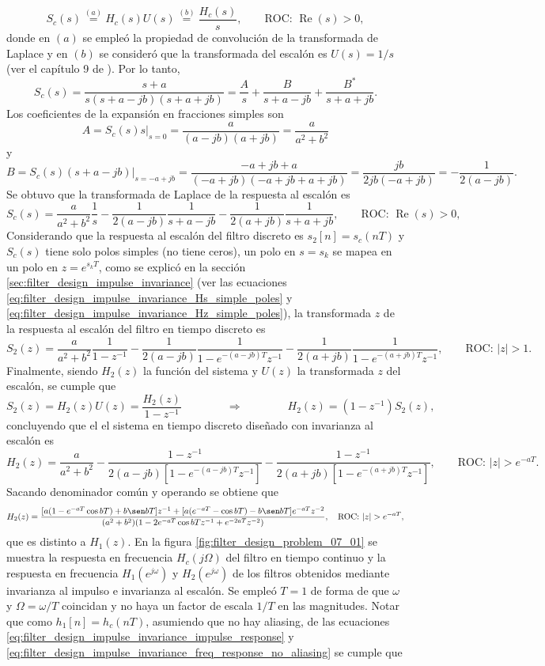 \documentclass[a4paper]{report}
\renewcommand{\Re}{\operatorname{Re}}
\begin{document}
\[
 S_c(s)\overset{(a)}{=}H_c(s)U(s)\overset{(b)}{=}\frac{H_c(s)}{s},
 \qquad\textrm{ROC: }\Re(s)>0,
\]
donde en \((a)\) se empleó la propiedad de convolución de la transformada de Laplace y en \((b)\) se consideró que la transformada del escalón es  \(U(s)=1/s\) (ver el capítulo 9 de \cite{oppenheim1997signals}). Por lo tanto,
\[
 S_c(s)=\frac{s+a}{s(s+a-jb)(s+a+jb)}
  =\frac{A}{s}+\frac{B}{s+a-jb}+\frac{B^*}{s+a+jb}.
\]
Los coeficientes de la expansión en fracciones simples son
\[
 A=S_c(s)s\Big|_{s=0}=\frac{a}{(a-jb)(a+jb)}=\frac{a}{a^2+b^2}
\]
y
\[
 B=S_c(s)(s+a-jb)\Big|_{s=-a+jb}=\frac{-a+jb+a}{(-a+jb)(-a+jb+a+jb)}=\frac{jb}{2jb(-a+jb)}=-\frac{1}{2(a-jb)}.
\]
Se obtuvo que la transformada de Laplace de la respuesta al escalón es  
\[
 S_c(s)=\frac{a}{a^2+b^2}\frac{1}{s}-\frac{1}{2(a-jb)}\frac{1}{s+a-jb}-\frac{1}{2(a+jb)}\frac{1}{s+a+jb},
 \qquad\textrm{ROC: }\Re(s)>0,
\]
Considerando que la respuesta al escalón del filtro discreto es \(s_2[n]=s_c(nT)\) y \(S_c(s)\) tiene solo polos simples (no tiene ceros), un polo en \(s=s_k\) se mapea en un polo en \(z=e^{s_kT}\), como se explicó en la sección \ref{sec:filter_design_impulse_invariance} (ver las ecuaciones \ref{eq:filter_design_impulse_invariance_Hs_simple_poles} y \ref{eq:filter_design_impulse_invariance_Hz_simple_poles}), la transformada \(z\) de la respuesta al escalón del filtro en tiempo discreto es
\[
 S_2(z)=\frac{a}{a^2+b^2}\frac{1}{1-z^{-1}}-\frac{1}{2(a-jb)}\frac{1}{1-e^{-(a-jb)T}z^{-1}}-\frac{1}{2(a+jb)}\frac{1}{1-e^{-(a+jb)T}z^{-1}},
 \qquad\textrm{ROC: }|z|>1.
\]
Finalmente, siendo \(H_2(z)\) la función del sistema y \(U(z)\) la transformada \(z\) del escalón, se cumple que 
\[
 S_2(z)=H_2(z)U(z)=\frac{H_2(z)}{1-z^{-1}}
 \qquad\qquad\Rightarrow\qquad\qquad
 H_2(z)=(1-z^{-1})S_2(z),
\]
concluyendo que el el sistema en tiempo discreto diseñado con invarianza al escalón es
\[
 H_2(z)=\frac{a}{a^2+b^2}-\frac{1-z^{-1}}{2(a-jb)[1-e^{-(a-jb)T}z^{-1}]}-\frac{1-z^{-1}}{2(a+jb)[1-e^{-(a+jb)T}z^{-1}]},
 \qquad\textrm{ROC: }|z|>e^{-aT}.
\]
Sacando denominador común y operando se obtiene que 
\[
 H_2(z)=\frac{[a(1-e^{-aT}\cos bT)+b\sen bT]z^{-1}+[a(e^{-aT}-\cos bT)-b\sen bT]e^{-aT}z^{-2}}{(a^2+b^2)(1-2e^{-aT}\cos bTz^{-1}+e^{-2aT}z^{-2})},
 \quad\textrm{ROC: }|z|>e^{-aT},
\]
que es distinto a \(H_1(z)\). En la figura \ref{fig:filter_design_problem_07_01} se muestra la respuesta en frecuencia \(H_c(j\Omega)\) del filtro en tiempo continuo y la respuesta en frecuencia \(H_1(e^{j\omega})\) y \(H_2(e^{j\omega})\) de los filtros obtenidos mediante invarianza al impulso e invarianza al escalón. Se empleó \(T=1\) de forma de que \(\omega\) y \(\Omega=\omega/T\) coincidan y no haya un factor de escala \(1/T\) en las magnitudes. Notar que como \(h_1[n]=h_c(nT)\), asumiendo que no hay aliasing, de las ecuaciones \ref{eq:filter_design_impulse_invariance_impulse_response} y \ref{eq:filter_design_impulse_invariance_freq_response_no_aliasing} se cumple que 
\end{document}
